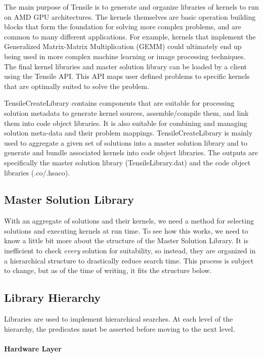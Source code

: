 \documentclass[]{article}
\begin{document}
The main purpose of Tensile is to generate and organize libraries of kernels to run on AMD GPU architectures. The kernels themselves are basic operation building blocks that form the foundation for solving more complex problems, and are common to many different applications. For example, kernels that implement the Generalized Matrix-Matrix Multiplication (GEMM) could ultimately end up being used in more complex machine learning or image processing techniques.
The final kernel libraries and master solution library can be loaded by a client using the Tensile API. This API maps user defined problems to specific kernels that are optimally suited to solve the problem.

TensileCreateLibrary contains components that are suitable for processing solution metadata to generate kernel sources, assemble/compile them, and link them into code object libraries. It is also suitable for combining and managing solution meta-data and their problem mappings. TensileCreateLibrary is mainly used to aggregate a given set of solutions into a master solution library and to generate and bundle associated kernels into code object libraries. The outputs are specifically the master solution library (TensileLibrary.dat) and the code object libraries (.co/.hsaco).

\subsection{Master Solution Library}

With an aggregate of solutions and their kernels, we need a method for selecting solutions and executing kernels at run time. To see how this works, we need to know a little bit more about the structure of the Master Solution Library. It is inefficient to check \textit{every} solution for suitability, so instead, they are organized in a hierarchical structure to drastically reduce search time. This process is subject to change, but as of the time of writing, it fits the structure below.

\subsection{Library Hierarchy}

Libraries are used to implement hierarchical searches. At each level of the hierarchy, the predicates must be asserted before moving to the next level.

\paragraph{Hardware Layer}
\end{document}
